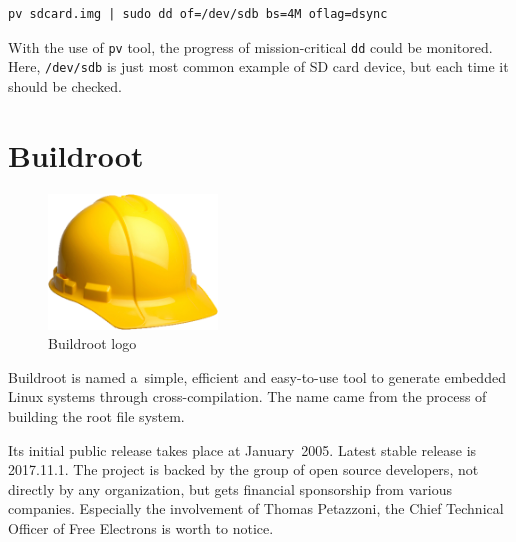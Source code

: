 \documentclass[printmode]{mgr}
\begin{document}
\begin{lstlisting}
pv sdcard.img | sudo dd of=/dev/sdb bs=4M oflag=dsync
\end{lstlisting}

With the use of \verb|pv| tool, the progress of mission-critical \verb|dd| could be monitored. Here, \verb|/dev/sdb| is just most common example of SD card device, but each time it should be checked.












\section{Buildroot}


\begin{figure}[htbp]
  \centering
    \includegraphics[width=0.4\textwidth]{buildroot-logo.png}
    \caption{Buildroot logo}
  \label{fig:buildroot-logo}
\end{figure}

Buildroot is named a~simple, efficient and easy-to-use tool to generate embedded Linux systems through cross-compilation. The name came from the process of building the root file system.

Its initial public release takes place at January~2005. Latest stable release is 2017.11.1. The project is backed by the group of open source developers, not directly by any organization, but gets financial sponsorship from various companies. Especially the involvement of Thomas Petazzoni, the Chief Technical Officer of Free Electrons is worth to notice.\cite{web:buildroot-tpetazzoni}
\end{document}
